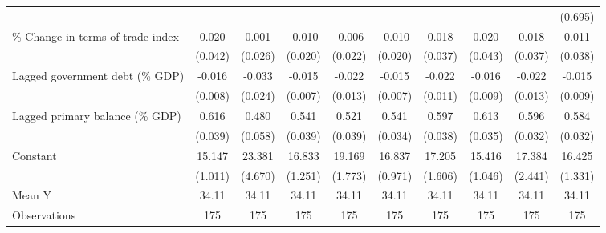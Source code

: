 {\begin{tabular}{l*{9}{c}}
                    &                     &                     &                     &                     &                     &                     &                     &                     &     (0.695)         \\
\addlinespace
\% Change in terms-of-trade index&       0.020         &       0.001         &      -0.010         &      -0.006         &      -0.010         &       0.018         &       0.020         &       0.018         &       0.011         \\
                    &     (0.042)         &     (0.026)         &     (0.020)         &     (0.022)         &     (0.020)         &     (0.037)         &     (0.043)         &     (0.037)         &     (0.038)         \\
\addlinespace
Lagged government debt (\% GDP)&      -0.016\sym{*}  &      -0.033         &      -0.015\sym{**} &      -0.022         &      -0.015\sym{**} &      -0.022\sym{*}  &      -0.016\sym{*}  &      -0.022         &      -0.015         \\
                    &     (0.008)         &     (0.024)         &     (0.007)         &     (0.013)         &     (0.007)         &     (0.011)         &     (0.009)         &     (0.013)         &     (0.009)         \\
\addlinespace
Lagged primary balance (\% GDP)&       0.616\sym{***}&       0.480\sym{***}&       0.541\sym{***}&       0.521\sym{***}&       0.541\sym{***}&       0.597\sym{***}&       0.613\sym{***}&       0.596\sym{***}&       0.584\sym{***}\\
                    &     (0.039)         &     (0.058)         &     (0.039)         &     (0.039)         &     (0.034)         &     (0.038)         &     (0.035)         &     (0.032)         &     (0.032)         \\
\addlinespace
Constant            &      15.147\sym{***}&      23.381\sym{***}&      16.833\sym{***}&      19.169\sym{***}&      16.837\sym{***}&      17.205\sym{***}&      15.416\sym{***}&      17.384\sym{***}&      16.425\sym{***}\\
                    &     (1.011)         &     (4.670)         &     (1.251)         &     (1.773)         &     (0.971)         &     (1.606)         &     (1.046)         &     (2.441)         &     (1.331)         \\
\midrule
Mean Y              &       34.11         &       34.11         &       34.11         &       34.11         &       34.11         &       34.11         &       34.11         &       34.11         &       34.11         \\
Observations        &         175         &         175         &         175         &         175         &         175         &         175         &         175         &         175         &         175         \\
\bottomrule
\end{tabular}
}
